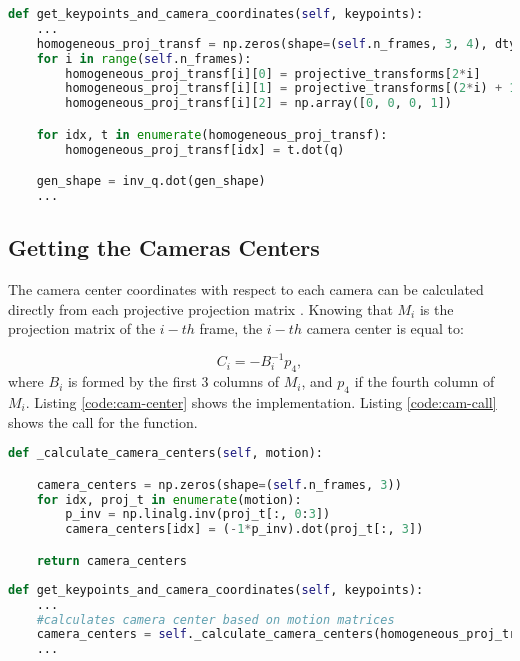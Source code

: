 \documentclass[]{IEEEtran}
\begin{document}
\begin{lstlisting}[language=Python, caption={Correcting Ambiguity for Shape and Motion matrices.}, label={code:multiply-q}]
def get_keypoints_and_camera_coordinates(self, keypoints):
    ...
    homogeneous_proj_transf = np.zeros(shape=(self.n_frames, 3, 4), dtype=np.float32)
    for i in range(self.n_frames):
        homogeneous_proj_transf[i][0] = projective_transforms[2*i]
        homogeneous_proj_transf[i][1] = projective_transforms[(2*i) + 1]
        homogeneous_proj_transf[i][2] = np.array([0, 0, 0, 1])

    for idx, t in enumerate(homogeneous_proj_transf):
        homogeneous_proj_transf[idx] = t.dot(q)

    gen_shape = inv_q.dot(gen_shape)
    ...
\end{lstlisting}

\subsection{Getting the Cameras Centers}
The camera center coordinates with respect to each camera can be calculated directly from each projective projection matrix \cite{CLASS:CC}. Knowing that $M_{i}$ is the projection matrix of the $i-th$ frame, the $i-th$ camera center is equal to:

\begin{equation}
    C_{i} = -B_{i}^{-1}p_{4},
\end{equation}{}
where $B_{i}$ is formed by the first 3 columns of $M_{i}$, and $p_{4}$ if the fourth column of $M_{i}$. Listing \ref{code:cam-center} shows the implementation. Listing \ref{code:cam-call} shows the call for the function.

\begin{lstlisting}[language=Python, caption={Camera center calculation.}, label={code:cam-center}]
def _calculate_camera_centers(self, motion):

    camera_centers = np.zeros(shape=(self.n_frames, 3))
    for idx, proj_t in enumerate(motion):
        p_inv = np.linalg.inv(proj_t[:, 0:3])
        camera_centers[idx] = (-1*p_inv).dot(proj_t[:, 3])

    return camera_centers
\end{lstlisting}

\begin{lstlisting}[language=Python, caption={Call for cameras centers calculation.}, label={code:cam-call}]
def get_keypoints_and_camera_coordinates(self, keypoints):
    ...
    #calculates camera center based on motion matrices
    camera_centers = self._calculate_camera_centers(homogeneous_proj_transf)
    ...
\end{lstlisting}
\end{document}
